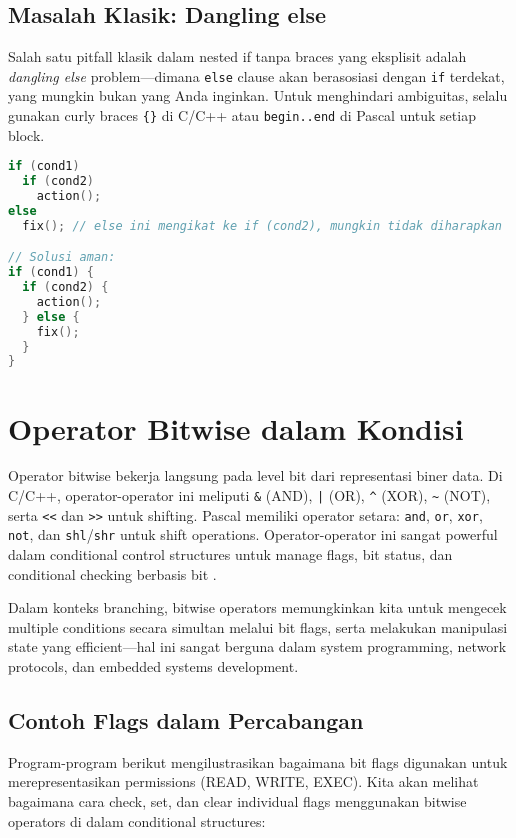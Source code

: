 \documentclass[../main.tex]{subfiles}
\begin{document}
\subsection{Masalah Klasik: Dangling else}
Salah satu pitfall klasik dalam nested if tanpa braces yang eksplisit adalah \emph{dangling else} problem—dimana \texttt{else} clause akan berasosiasi dengan \texttt{if} terdekat, yang mungkin bukan yang Anda inginkan. Untuk menghindari ambiguitas, selalu gunakan curly braces \texttt{\{\}} di C/C++ atau \texttt{begin..end} di Pascal untuk setiap block.
\begin{lstlisting}[language=C, caption={Dangling else dan solusinya}]
if (cond1)
  if (cond2)
    action();
else
  fix(); // else ini mengikat ke if (cond2), mungkin tidak diharapkan

// Solusi aman:
if (cond1) {
  if (cond2) {
    action();
  } else {
    fix();
  }
}
\end{lstlisting}

\section{Operator Bitwise dalam Kondisi}
Operator bitwise bekerja langsung pada level bit dari representasi biner data. Di C/C++, operator-operator ini meliputi \texttt{\&} (AND), \texttt{|} (OR), \texttt{\^{}} (XOR), \texttt{\~{}} (NOT), serta \texttt{\textless\textless} dan \texttt{\textgreater\textgreater} untuk shifting. Pascal memiliki operator setara: \texttt{and}, \texttt{or}, \texttt{xor}, \texttt{not}, dan \texttt{shl}/\texttt{shr} untuk shift operations. Operator-operator ini sangat powerful dalam conditional control structures untuk manage flags, bit status, dan conditional checking berbasis bit \parencite{free-pascal-docs,iso-c-draft-n1570,cpp-reference}.

Dalam konteks branching, bitwise operators memungkinkan kita untuk mengecek multiple conditions secara simultan melalui bit flags, serta melakukan manipulasi state yang efficient—hal ini sangat berguna dalam system programming, network protocols, dan embedded systems development.

\subsection{Contoh Flags dalam Percabangan}

Program-program berikut mengilustrasikan bagaimana bit flags digunakan untuk merepresentasikan permissions (READ, WRITE, EXEC). Kita akan melihat bagaimana cara check, set, dan clear individual flags menggunakan bitwise operators di dalam conditional structures:
\end{document}
